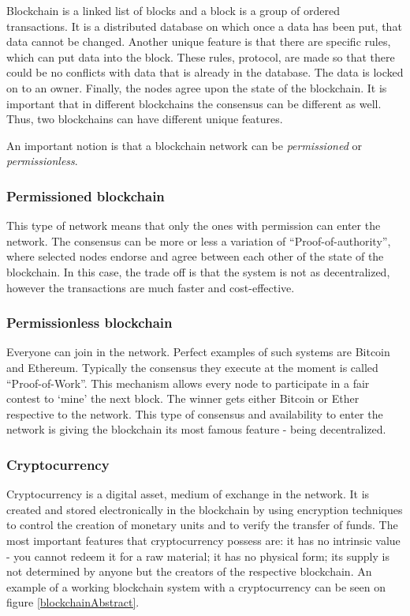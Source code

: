 \documentclass[a4paper,11pt]{report}
\begin{document}
	Blockchain is a linked list of blocks and a block is a group of ordered transactions. It is a distributed database on which once a data has been put, that data cannot be changed. Another unique feature is that there are specific rules, which can put data into the block. These rules, protocol, are made so that there could be no conflicts with data that is already in the database. The data is locked on to an owner. Finally, the nodes agree upon the state of the blockchain.\cite{whatIsBlockchain} It is important that in different blockchains the consensus can be different as well. Thus, two blockchains can have different unique features.
	
	An important notion is that a blockchain network can be \textit{permissioned} or \textit{permissionless}.

\subsubsection{Permissioned blockchain}
This type of network means that only the ones with permission can enter the network. The consensus can be more or less a variation of “Proof-of-authority”, where selected nodes endorse and agree between each other of the state of the blockchain. In this case, the trade off is that the system is not as decentralized, however the transactions are much faster and cost-effective.

\subsubsection{Permissionless blockchain}
Everyone can join in the network. Perfect examples of such systems are Bitcoin and Ethereum. Typically the consensus they execute at the moment is called “Proof-of-Work”. This mechanism allows every node to participate in a fair contest to ‘mine’ the next block. The winner gets either Bitcoin or Ether respective to the network. This type of consensus and availability to enter the network is giving the blockchain its most famous feature - being decentralized.

\subsubsection{Cryptocurrency}
Cryptocurrency is a digital asset, medium of exchange in the network. It is created and stored electronically in the blockchain by using encryption techniques to control the creation of monetary units and to verify the transfer of funds. The most important features that cryptocurrency possess are: it has no intrinsic value - you cannot redeem it for a raw material; it has no physical form; its supply is not determined by anyone but the creators of the respective blockchain. \cite{whatIsCryptocurrency}
An example of a working blockchain system with a cryptocurrency can be seen on figure \ref{blockchainAbstract}. 
\end{document}
